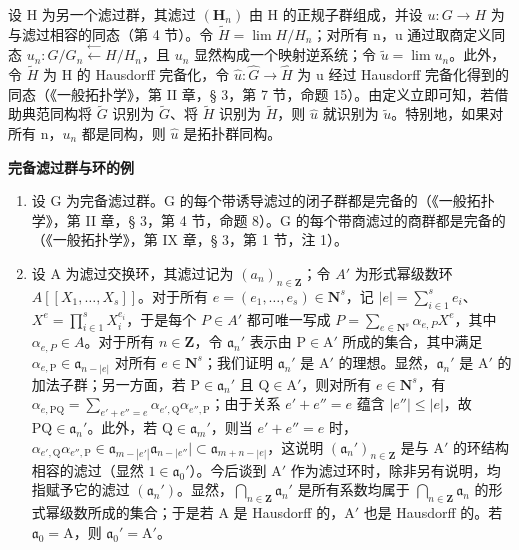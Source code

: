 设 H 为另一个滤过群，其滤过 \((\mathbf{H}_{n})\) 由 H 的正规子群组成，并设 \(u: G \to H\) 为与滤过相容的同态（第 4 节）。令 \(\tilde{H} = \lim H/H_{n}\)；对所有 n，u 通过取商定义同态 \(u_{n}: G/G_{n} \xleftarrow{\leftarrow} H/H_{n}\)，且 \(u_{n}\) 显然构成一个映射逆系统；令 \(\tilde{u} = \lim u_{n}\)。此外，令 \(\tilde{H}\) 为 H 的 Hausdorff 完备化，令 \(\hat{u}: \hat{G} \to \hat{H}\) 为 u 经过 Hausdorff 完备化得到的同态（《一般拓扑学》，第 II 章，§ 3，第 7 节，命题 15）。由定义立即可知，若借助典范同构将 \(\tilde{G}\) 识别为 \(\tilde{G}\)、将 \(\tilde{H}\) 识别为 \(\tilde{H}\)，则 \(\hat{u}\) 就识别为 \(\tilde{u}\)。特别地，如果对所有 n，\(u_{n}\) 都是同构，则 \(\hat{u}\) 是拓扑群同构。

\textbf{完备滤过群与环的例}\par

\begin{enumerate}
\def\labelenumi{(\arabic{enumi})}
\item
  设 G 为完备滤过群。G 的每个带诱导滤过的闭子群都是完备的（《一般拓扑学》，第 II 章，§ 3，第 4 节，命题 8）。G 的每个带商滤过的商群都是完备的（《一般拓扑学》，第 IX 章，§ 3，第 1 节，注 1）。
\item
	设 A 为滤过交换环，其滤过记为 \((a_n)_{n\in \mathbf{Z}}\)；令 \(A'\) 为形式幂级数环 \(A[[X_1,\ldots ,X_s]]\)。对于所有 \(e = (e_1,\dots ,e_s)\in \mathbf{N}^s\)，记 \(|e| = \sum_{i\in 1}^{s}e_i\)、\(X^e = \prod_{i\in 1}^{s}X_i^{e_i}\)，于是每个 \(P\in A'\) 都可唯一写成 \(P = \sum_{e\in \mathbf{N}^s}\alpha_{e,P}X^e\)，其中 \(\alpha_{e,P}\in A\)。对于所有 \(n\in \mathbf{Z}\)，令 \(\mathfrak{a}_n'\) 表示由 \(\mathrm{P} \in \mathrm{A}'\) 所成的集合，其中满足 \(\alpha_{e,\mathrm{P}} \in \mathfrak{a}_{n-|e|}\) 对所有 \(e \in \mathbf{N}^s\)；我们证明 \(\mathfrak{a}_n'\) 是 \(\mathrm{A}'\) 的理想。显然，\(\mathfrak{a}_n'\) 是 \(\mathrm{A}'\) 的加法子群；另一方面，若 \(\mathrm{P} \in \mathfrak{a}_n'\) 且 \(\mathrm{Q} \in \mathrm{A}'\)，则对所有 \(e \in \mathbf{N}^s\)，有 \(\alpha_{e,\mathrm{PQ}} = \sum_{e' + e'' = e} \alpha_{e',\mathrm{Q}} \alpha_{e'',\mathrm{P}}\)；由于关系 \(e' + e'' = e\) 蕴含 \(|e''| \leqslant |e|\)，故 \(\mathrm{PQ} \in \mathfrak{a}_n'\)。此外，若 \(\mathrm{Q} \in \mathfrak{a}_m'\)，则当 \(e' + e'' = e\) 时，\(\alpha_{e',\mathrm{Q}} \alpha_{e'',\mathrm{P}} \in \mathfrak{a}_{m-|e'|} \mathfrak{a}_{n-|e''}| \subset \mathfrak{a}_{m+n-|e|}\)，这说明 \((\mathfrak{a}_n')_{n \in \mathbf{Z}}\) 是与 \(\mathrm{A}'\) 的环结构相容的滤过（显然 \(1 \in \mathfrak{a}_0'\)）。今后谈到 \(\mathrm{A}'\) 作为滤过环时，除非另有说明，均指赋予它的滤过 \((\mathfrak{a}_n')\)。显然，\(\bigcap_{n \in \mathbf{Z}} \mathfrak{a}_n'\) 是所有系数均属于 \(\bigcap_{n \in \mathbf{Z}} \mathfrak{a}_n\) 的形式幂级数所成的集合；于是若 A 是 Hausdorff 的，\(\mathrm{A}'\) 也是 Hausdorff 的。若 \(\mathfrak{a}_0 = \mathrm{A}\)，则 \(\mathfrak{a}_0' = \mathrm{A}'\)。
\end{enumerate}


